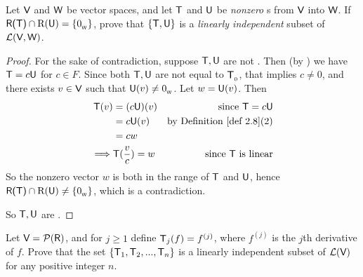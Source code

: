 \begin{exercise} \label{exercise 2.2.14}
Let \(\textsf{V}\) and \(\textsf{W}\) be vector spaces, and let \(\textsf{T}\) and \(\textsf{U}\) be \emph{nonzero} \LTRAN{}s from \(\textsf{V}\) into \(\textsf{W}\).
If \(\textsf{R(T)} \cap \mathrm{R}(\textsf{U}) = \{ 0_{_{\textsf{W}}} \}\), prove that
\(\{ \textsf{T}, \textsf{U} \}\) is a \emph{linearly independent} subset of \(\mathcal{L}(\textsf{V}, \textsf{W})\).
\end{exercise}

\begin{proof}
For the sake of contradiction, suppose \(\textsf{T}, \textsf{U}\) are not \LID{}.
Then (by ) we have \(\textsf{T} = c\textsf{U}\) for \(c \in F\).
Since both \(\textsf{T}, \textsf{U}\) are not equal to \(\textsf{T}_{_0}\), that implies \(c \ne 0\), and there exists \(v \in \textsf{V}\) such that \(\textsf{U}(v) \ne 0_{_{\textsf{W}}}\).
Let \(w = \textsf{U}(v)\).
Then
\begin{align*}
    \T(v) & = (c\U)(v) & \text{since \(\T = c\U\)} \\
          & = c\U(v) & \text{by \DEF{2.8}(2)} \\
          & = cw \\
    \implies & \T(\frac{v}{c}) = w & \text{since \(\T\) is linear}
\end{align*}
So the nonzero vector \(w\) is both in the range of \(\textsf{T}\) and \(\textsf{U}\), hence \(\textsf{R(T)} \cap \mathrm{R}(\textsf{U}) \ne \{ 0_{_{\textsf{W}}} \}\), which is a contradiction.

So \(\textsf{T}, \textsf{U}\) are \LID{}.
\end{proof}

\begin{exercise} \label{exercise 2.2.15}
Let \(\textsf{V} = \mathcal{P}(\textsf{R})\), and for \(j \ge 1\) define \(\textsf{T}_j(f) = f^{(j)}\), where \(f^{(j)}\) is the \(j\)th derivative of \(f\).
Prove that the set \(\{ \textsf{T}_1, \textsf{T}_2, ..., \textsf{T}_n \}\) is a
linearly independent subset of \(\mathcal{L}(\textsf{V})\) for any positive integer \(n\).
\end{exercise}


